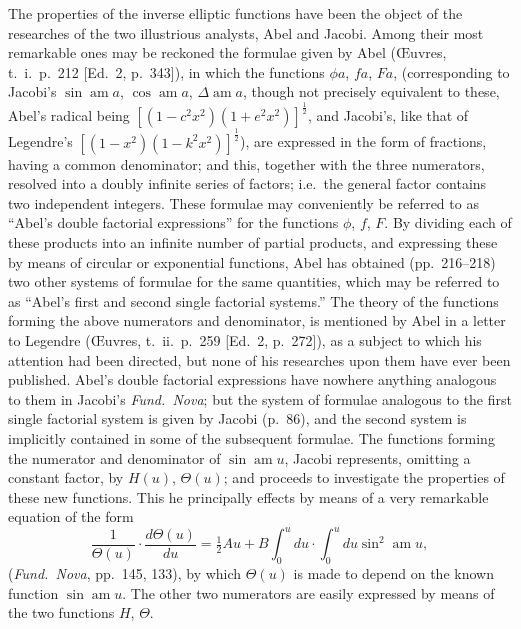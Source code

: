 \documentclass[12pt,a4paper]{article}
\begin{document}
The properties of the inverse elliptic functions have been the object of the researches of the two illustrious analysts, Abel and Jacobi. Among their most remarkable ones may be reckoned the formulae given by Abel (\OE uvres, t.~i.\ p.~212 [Ed.~2, p.~343]), in which the functions $\phi a$, $fa$, $Fa$, (corresponding to Jacobi's $\sin\operatorname{am} a$, $\cos\operatorname{am} a$, $\Delta\operatorname{am} a$, though not precisely equivalent to these, Abel's radical being $[(1-c^2x^2)(1+e^2x^2)]^{\frac{1}{2}}$, and Jacobi's, like that of Legendre's $[(1-x^2)(1-k^2 x^2)]^{\frac{1}{2}}$), are expressed in the form of fractions, having a common denominator; and this, together with the three numerators, resolved into a doubly infinite series of factors; i.e.\ the general factor contains two independent integers. These formulae may conveniently be referred to as ``Abel's double factorial expressions'' for the functions $\phi$, $f$, $F$. By dividing each of these products into an infinite number of partial products, and expressing these by means of circular or exponential functions, Abel has obtained (pp.~216--218) two other systems of formulae for the same quantities, which may be referred to as ``Abel's first and second single factorial systems.'' The theory of the functions forming the above numerators and denominator, is mentioned by Abel in a letter to Legendre (\OE uvres, t.~ii.\ p.~259 [Ed.~2, p.~272]), as a subject to which his attention had been directed, but none of his researches upon them have ever been published. Abel's double factorial expressions have nowhere anything analogous to them in Jacobi's \textit{Fund.\ Nova}; but the system of formulae analogous to the first single factorial system is given by Jacobi (p.~86), and the second system is implicitly contained in some of the subsequent formulae. The functions forming the numerator and denominator of $\sin\operatorname{am} u$, Jacobi represents, omitting a constant factor, by $H(u)$, $\Theta(u)$; and proceeds to investigate the properties of these new functions. This he principally effects by means of a very remarkable equation of the form
\[
\frac{1}{\Theta(u)}\cdot\frac{d\Theta(u)}{du} = \tfrac{1}{2}Au + B\int_0^u du \cdot \int_0^u du \sin^2\operatorname{am} u,
\]
(\textit{Fund.\ Nova}, pp.~145, 133), by which $\Theta(u)$ is made to depend on the known function $\sin\operatorname{am} u$. The other two numerators are easily expressed by means of the two functions $H$, $\Theta$.

\newpage
\setcounter{page}{137}
\end{document}
